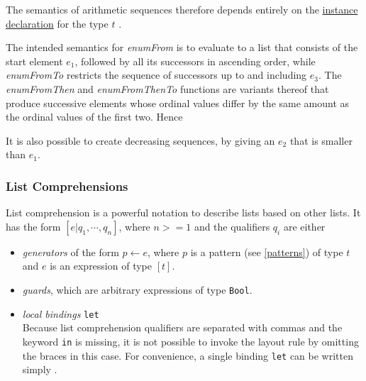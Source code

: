 
The semantics of arithmetic sequences therefore depends entirely on the \hyperref[instdcl]{instance declaration}
for the type $t$ .

The intended semantics for \emph{enumFrom} is to evaluate to a list that consists of the start element $e_1$, followed by all its successors in ascending order, while \emph{enumFromTo} restricts the sequence of successors up to and including $e_3$. The \emph{enumFromThen} and \emph{enumFromThenTo} functions are variants thereof that produce successive elements whose ordinal values differ by the same amount as the ordinal values of the first two. Hence


It is also possible to create decreasing sequences, by giving an $e_2$ that is smaller than $e_1$.

\subsubsection{List Comprehensions}  

List comprehension is a powerful notation to describe lists based on other lists. It has the form $[ e | q_1, \cdots, q_n]$, where $n>=1$ and the qualifiers $q_i$ are either
\begin{itemize}
\item \emph{generators} of the form $p \leftarrow{} e$, where $p$ is a pattern (see \autoref{patterns}) of type $t$ and $e$ is an expression of type $[t]$.
\item \emph{guards}, which are arbitrary expressions of type \texttt{Bool}.
\item \emph{local bindings} \texttt{let} \bracea{}  \bracez{}\\
Because list comprehension qualifiers are separated with commas and the keyword \texttt{in} is missing, 
it is not possible to invoke the layout rule by omitting the braces in this case. 
For convenience, a single binding \texttt{let} \bracea{}  \bracez{}
can be written simply .
\end{itemize}

